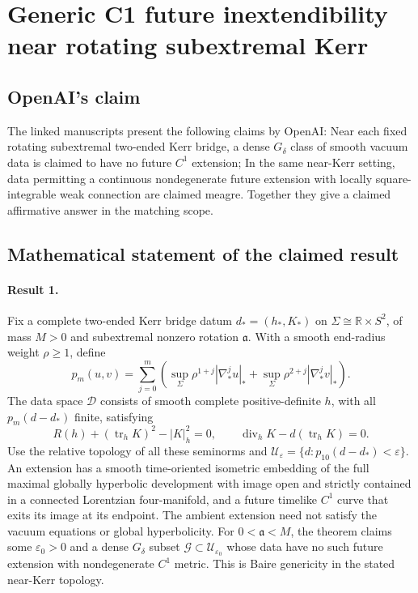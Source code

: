 \documentclass[11pt]{article}
\begin{document}
\section*{Generic C1 future inextendibility near rotating subextremal Kerr}

\subsection{OpenAI's claim}
The linked manuscripts present the following claims by OpenAI: Near each fixed rotating subextremal two-ended Kerr bridge, a dense $G_\delta$ class of smooth vacuum data is claimed to have no future $C^1$ extension; In the same near-Kerr setting, data permitting a continuous nondegenerate future extension with locally square-integrable weak connection are claimed meagre. Together they give a claimed affirmative answer in the matching scope.

\subsection{Mathematical statement of the claimed result}
\paragraph{Result 1.} Fix a complete two-ended Kerr bridge datum \(d_*=(h_*,K_*)\) on \(\Sigma\cong\mathbb R\times S^2\), of mass \(M>0\) and subextremal nonzero rotation \(\mathfrak a\). With a smooth end-radius weight \(\rho\ge1\), define
\[
 p_m(u,v)=\sum_{j=0}^m\left(\sup_\Sigma\rho^{1+j}|\nabla_*^ju|_*+
 \sup_\Sigma\rho^{2+j}|\nabla_*^jv|_*\right).
\]
The data space \(\mathcal D\) consists of smooth complete positive-definite \(h\), with all \(p_m(d-d_*)\) finite, satisfying
\[
 R(h)+(\operatorname{tr}_hK)^2-|K|_h^2=0,\qquad
 \operatorname{div}_hK-d(\operatorname{tr}_hK)=0.
\]
Use the relative topology of all these seminorms and \(\mathcal U_\varepsilon=\{d:p_{10}(d-d_*)<\varepsilon\}\). An extension has a smooth time-oriented isometric embedding of the full maximal globally hyperbolic development with image open and strictly contained in a connected Lorentzian four-manifold, and a future timelike \(C^1\) curve that exits its image at its endpoint. The ambient extension need not satisfy the vacuum equations or global hyperbolicity. For \(0<\mathfrak a<M\), the theorem claims some \(\varepsilon_0>0\) and a dense \(G_\delta\) subset \(\mathcal G\subset\mathcal U_{\varepsilon_0}\) whose data have no such future extension with nondegenerate \(C^1\) metric. This is Baire genericity in the stated near-Kerr topology.
\end{document}
